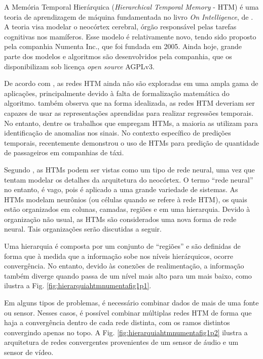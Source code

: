 \newcommand{\topico}[1]{\vspace{1em}\noindent{\textbf{#1}\\~\\}}
\newcommand{\numenta}{\citeonline{Numenta}}
\newcommand{\cui}{\citeonline{Cui}}


A Memória Temporal Hierárquica (\textit{Hierarchical Temporal Memory} - HTM) é uma teoria de aprendizagem de máquina fundamentada no livro \textit{On Intelligence}, de . A teoria visa modelar o neocórtex cerebral, órgão responsável pelas tarefas cognitivas nos mamíferos. Esse modelo é relativamente novo, tendo sido proposto pela companhia Numenta Inc., que foi fundada em 2005. Ainda hoje, grande parte dos modelos e algoritmos são desenvolvidos pela companhia, que os disponibilizam sob licença \textit{open source} AGPLv3.

De acordo com , as redes HTM ainda não são exploradas em uma ampla gama de aplicações, principalmente devido à falta de formalização matemática do algoritmo.  também observa que na forma idealizada, as redes HTM deveriam ser capazes de usar as representações aprendidas para realizar regressões temporais. No entanto, dentre os trabalhos que empregam HTMs, a maioria as utilizam para identificação de anomalias nos sinais. No contexto específico de predições temporais,  recentemente demonstrou o uso de HTMs para predição de quantidade de passageiros em companhias de táxi.

Segundo \numenta, as HTMs podem ser vistas como um tipo de rede neural, uma vez que tentam modelar os detalhes da arquitetura do neocórtex. O termo ``rede neural'' no entanto, é vago, pois é aplicado a uma grande variedade de sistemas. As HTMs modelam neurônios (ou células quando se refere à rede HTM), os quais estão organizados em colunas, camadas, regiões e em uma hierarquia. Devido à organização não usual, as HTMs são considerados uma nova forma de rede neural. Tais organizações serão discutidas a seguir. 

Uma hierarquia é composta por um conjunto de ``regiões'' e são definidas de forma que à medida que a informação sobe nos níveis hierárquicos, ocorre convergência. No entanto, devido às conexões de realimentação, a informação também diverge quando passa de um nível mais alto para um mais baixo, como ilustra a Fig. \ref{fig:hierarquiahtmnumentafig1p1}.

Em alguns tipos de problemas, é necessário combinar dados de mais de uma fonte ou sensor. Nesses casos, é possível combinar múltiplas redes HTM de forma que haja a convergência dentro de cada rede distinta, com os ramos distintos convergindo apenas no topo. A Fig. \ref{fig:hierarquiahtmnumentafig1p2} ilustra a arquitetura de redes convergentes provenientes de um sensor de áudio e um sensor de vídeo.

